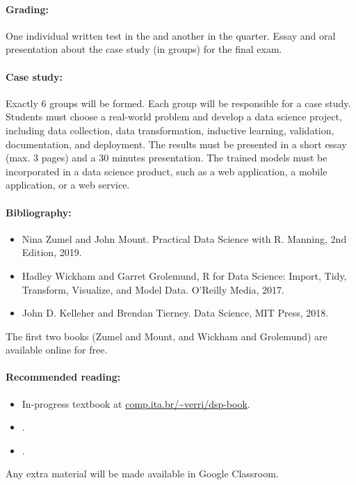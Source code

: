 \paragraph{Grading:} One individual written test in the  and another in the  quarter.
Essay and oral presentation about the case study (in groups) for the final exam.

\paragraph{Case study:} Exactly 6 groups will be formed.  Each group will be responsible for
a case study.  Students must choose a real-world problem and develop a data science
project, including data collection, data transformation, inductive learning, validation,
documentation, and deployment.  The results must be presented in a short essay (max. 3
pages) and a 30 minutes presentation.  The trained models must be incorporated in a data
science product, such as a web application, a mobile application, or a web service.

\thispagestyle{empty}
\paragraph{Bibliography:}
\begin{itemize}
  \item Nina Zumel and John Mount. Practical Data Science with R. Manning, 2nd Edition, 2019.
  \item Hadley Wickham and Garret Grolemund, R for Data Science: Import, Tidy, Transform, Visualize, and Model Data. O’Reilly Media, 2017.
  \item John D. Kelleher and Brendan Tierney. Data Science, MIT Press, 2018.
\end{itemize}

The first two books (Zumel and Mount, and Wickham and Grolemund) are available online for free.

\thispagestyle{empty}
\paragraph{Recommended reading:}
\begin{itemize}
  \item In-progress textbook at \href{https://comp.ita.br/~verri/dsp-book}{comp.ita.br/\textasciitilde{}verri/dsp-book}.
  \item {}.
  \item {}.
\end{itemize}
Any extra material will be made available in Google Classroom.


